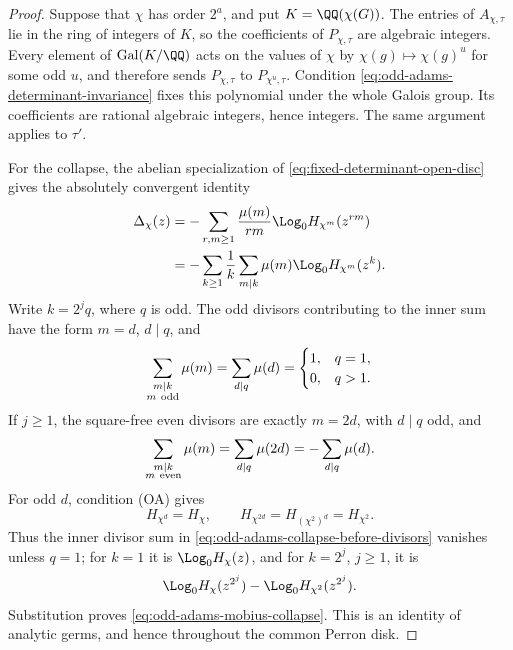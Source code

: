 \begin{proof}
Suppose that \(\chi\) has order \(2^a\), and put
\(K=\QQ(\chi(G))\).  The entries of \(A_{\chi,\tau}\) lie in the ring of
integers of \(K\), so the coefficients of \(P_{\chi,\tau}\) are algebraic
integers.  Every element of \(\operatorname{Gal}(K/\QQ)\) acts on the values
of \(\chi\) by \(\chi(g)\mapsto\chi(g)^u\) for some odd \(u\), and therefore
sends \(P_{\chi,\tau}\) to \(P_{\chi^u,\tau}\).  Condition
\eqref{eq:odd-adams-determinant-invariance} fixes this polynomial under the
whole Galois group.  Its coefficients are rational algebraic integers, hence
integers.  The same argument applies to \(\tau'\).

For the collapse, the abelian specialization of
\eqref{eq:fixed-determinant-open-disc} gives the absolutely convergent identity
\begin{align}
 \Delta_\chi(z)
 &=-\sum_{r,m\ge1}\frac{\mu(m)}{rm}
      \Log_0H_{\chi^m}(z^{rm})\notag\\
 &=-\sum_{k\ge1}\frac1k\sum_{m\mid k}\mu(m)
      \Log_0H_{\chi^m}(z^k).
 \label{eq:odd-adams-collapse-before-divisors}
\end{align}
Write \(k=2^jq\), where \(q\) is odd.  The odd divisors contributing to the
inner sum have the form \(m=d\), \(d\mid q\), and
\[
 \sum_{\substack{m\mid k\\m\ {\rm odd}}}\mu(m)
 =\sum_{d\mid q}\mu(d)
 =\begin{cases}1,&q=1,\\0,&q>1.\end{cases}
\]
If \(j\ge1\), the square-free even divisors are exactly \(m=2d\), with
\(d\mid q\) odd, and
\[
 \sum_{\substack{m\mid k\\m\ {\rm even}}}\mu(m)
 =\sum_{d\mid q}\mu(2d)
 =-\sum_{d\mid q}\mu(d).
\]
For odd \(d\), condition (OA) gives
\[
 H_{\chi^d}=H_\chi,\qquad
 H_{\chi^{2d}}=H_{(\chi^2)^d}=H_{\chi^2}.
\]
Thus the inner divisor sum in
\eqref{eq:odd-adams-collapse-before-divisors} vanishes unless \(q=1\);
for \(k=1\) it is \(\Log_0H_\chi(z)\), and for \(k=2^j\), \(j\ge1\), it is
\[
 \Log_0H_\chi(z^{2^j})-\Log_0H_{\chi^2}(z^{2^j}).
\]
Substitution proves \eqref{eq:odd-adams-mobius-collapse}.  This is an
identity of analytic germs, and hence throughout the common Perron disk.
\end{proof}

